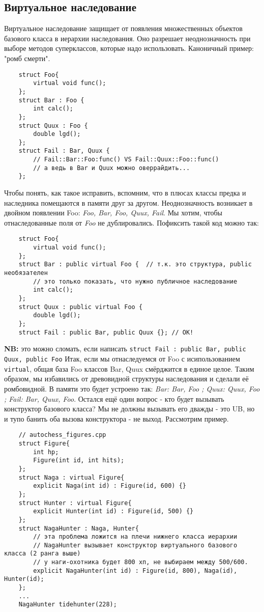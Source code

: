 \documentclass[15pt, a4paper]{article}
\newcommand{\nl}{\newline}
\begin{document}
\subsection{Виртуальное наследование}
Виртуальное наследование защищает от появления множественных объектов базового класса в иерархии наследования.
Оно разрешает неоднозначность при выборе методов суперклассов, которые надо использовать. Каноничный пример: "ромб смерти".
\begin{verbatim}
    struct Foo{
        virtual void func();
    };
    struct Bar : Foo {
        int calc();
    };
    struct Quux : Foo {
        double lgd();
    };
    struct Fail : Bar, Quux {
        // Fail::Bar::Foo:func() VS Fail::Quux::Foo::func()
        // а ведь в Bar и Quux можно оверрайдить...
    };
\end{verbatim}
Чтобы понять, как такое исправить, вспомним, что в плюсах классы предка и наследника помещаются в памяти друг за другом. Неоднозначность возникает в двойном появлении Foo:
\textit{Foo, Bar, Foo, Quux, Fail}. Мы хотим, чтобы отнаследованные поля от \textit{Foo} не дублировались.
Пофиксить такой код можно так:
\begin{verbatim}
    struct Foo{
        virtual void func();
    };
    struct Bar : public virtual Foo {  // т.к. это структура, public необязателен
        // это только показать, что нужно публичное наследование
        int calc();
    };
    struct Quux : public virtual Foo {
        double lgd();
    };
    struct Fail : public Bar, public Quux {}; // OK!
\end{verbatim}
\textbf{NB:} это можно сломать, если написать \texttt{struct Fail : public Bar, public Quux, public Foo} \nl
Итак, если мы отнаследуемся от Foo с исипользованием \texttt{virtual}, общая база Foo классов Bar, Quux смёрджится в единое целое. Таким образом, мы избавились от древовидной структуры наследования
и сделали её ромбовидной. \nl
В памяти это будет устроено так: \textit{Bar: Bar, Foo ; Quux: Quux, Foo ; Fail: Bar, Quux, Foo}. \nl
Остался ещё один вопрос - кто будет вызывать конструктор базового класса? Мы не должны вызывать его дважды - это UB, но и тупо банить оба вызова конструктора - не выход. Рассмотрим пример.\newpage
\begin{verbatim}
    // autochess_figures.cpp
    struct Figure{
        int hp;
        Figure(int id, int hits);
    }; 
    struct Naga : virtual Figure{
        explicit Naga(int id) : Figure(id, 600) {}
    };
    struct Hunter : virtual Figure{
        explicit Hunter(int id) : Figure(id, 500) {}
    };
    struct NagaHunter : Naga, Hunter{
        // эта проблема ложится на плечи нижнего класса иерархии
        // NagaHunter вызывает конструктор виртуального базового класса (2 ранга выше)
        // у наги-охотника будет 800 хп, не выбираем между 500/600.
        explicit NagaHunter(int id) : Figure(id, 800), Naga(id), Hunter(id);
    };
    ...
    NagaHunter tidehunter(228);
\end{verbatim}
\end{document}
